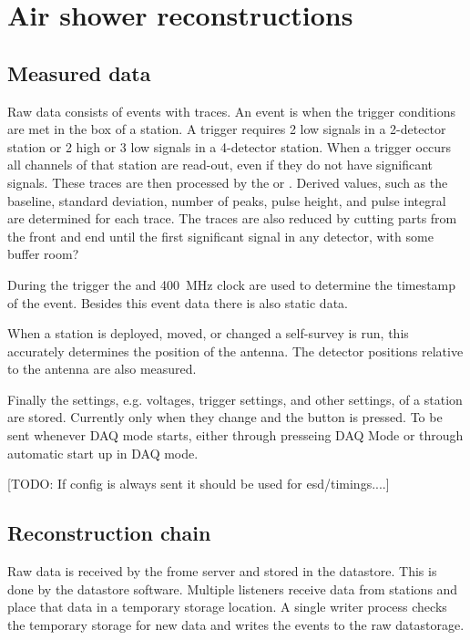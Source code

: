 \chapter{Air shower reconstructions}
\label{ch:analysis}


\section{Measured data}

Raw data consists of events with traces. An event is when the trigger
conditions are met in the \hisparc box of a station. A trigger requires
2 low signals in a 2-detector station or 2 high or 3 low signals in a
4-detector station. When a trigger occurs all \pmt channels of that
station are read-out, even if they do not have significant signals.
These traces are then processed by the \daq or \pysparc. Derived
values, such as the baseline, standard deviation, number of peaks,
pulse height, and pulse integral are determined for each trace. The traces
are also reduced by cutting parts from the front and end until the first
significant signal in any detector, with some buffer room?

During the trigger the \gps and \SI{400}{\mega\hertz} clock are used to
determine the \gps timestamp of the event. Besides this event data there
is also static data.

When a station is deployed, moved, or changed a \gps self-survey is run,
this accurately determines the position of the \gps antenna. The
detector positions relative to the \gps antenna are also measured.

Finally the settings, e.g. \pmt voltages, trigger settings, and other settings,
of a station are stored. Currently only when they change and the button is
pressed. To be sent whenever DAQ mode starts, either through presseing DAQ Mode
or through automatic start up in DAQ mode.

[TODO: If config is always sent it should be used for esd/timings....]


\section{Reconstruction chain}

Raw data is received by the frome server and stored in the \hisparc
datastore. This is done by the datastore software. Multiple listeners
receive data from stations and place that data in a temporary storage
location. A single writer process checks the temporary storage for new
data and writes the events to the raw datastorage.


